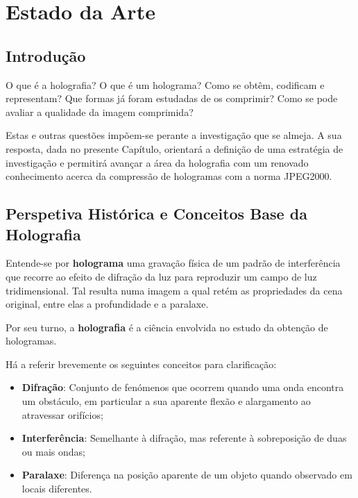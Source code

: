 \chapter{Estado da Arte}
\label{ch::estado-arte}

\section{Introdução}
\label{sec::estado-arte:intro}

O que é a holografia? O que é um holograma? Como se obtêm, codificam e representam? Que formas já foram estudadas de os comprimir? Como se pode avaliar a qualidade da imagem comprimida?

Estas e outras questões impõem-se perante a investigação que se almeja. A sua resposta, dada no presente Capítulo, orientará a definição de uma estratégia de investigação e permitirá avançar a área da holografia com um renovado conhecimento acerca da compressão de hologramas com a norma JPEG2000.

\section{Perspetiva Histórica e Conceitos Base da Holografia}
\label{sec::estado-arte:hist-base}

Entende-se por \textbf{holograma} uma gravação física de um padrão de interferência que recorre ao efeito de difração da luz para reproduzir um campo de luz tridimensional. Tal resulta numa imagem a qual retém as propriedades da cena original, entre elas a profundidade e a paralaxe\cite{holocenter}.

Por seu turno, a \textbf{holografia} é a ciência envolvida no estudo da obtenção de hologramas.

Há a referir brevemente os seguintes conceitos para clarificação:
\begin{itemize}
  \item \textbf{Difração}: Conjunto de fenómenos que ocorrem quando uma onda encontra um obstáculo, em particular a sua aparente flexão e alargamento ao atravessar orifícios\cite{Grimaldi2010,Cajori1929};
  \item \textbf{Interferência}: Semelhante à difração, mas referente à sobreposição de duas ou mais ondas;
  \item \textbf{Paralaxe}: Diferença na posição aparente de um objeto quando observado em locais diferentes\cite{stevenson2007shorter,waite2013pocket}.
\end{itemize}


